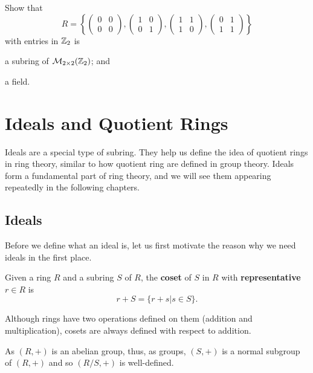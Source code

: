 \begin{problem}
    Show that
    \[
        R = \left\{\begin{pmatrix}0&0\\0&0\end{pmatrix},\begin{pmatrix}1&0\\0&1\end{pmatrix},\begin{pmatrix}1&1\\1&0\end{pmatrix},\begin{pmatrix}0&1\\1&1\end{pmatrix}\right\}
    \]
    with entries in $\mathbb{Z}_2$ is
    \begin{partquestions}{\roman*}
        \item a subring of $\mathcal{M}_{2\times2}(\mathbb{Z}_2)$; and
        \item a field.
    \end{partquestions}
\end{problem}

\chapter{Ideals and Quotient Rings}
Ideals are a special type of subring. They help us define the idea of quotient rings in ring theory, similar to how quotient ring are defined in group theory. Ideals form a fundamental part of ring theory, and we will see them appearing repeatedly in the following chapters.

\section{Ideals}
Before we define what an ideal is, let us first motivate the reason why we need ideals in the first place.
\begin{definition}
    Given a ring $R$ and a subring $S$ of $R$, the \textbf{coset} of $S$ in $R$ with \textbf{representative} $r \in R$ is
    \[
        r + S = \{r+s \vert s \in S\}.
    \]
\end{definition}
\begin{remark}
    Although rings have two operations defined on them (addition and multiplication), cosets are always defined with respect to addition.
\end{remark}
\begin{remark}
    As $(R,+)$ is an abelian group, thus, as groups, $(S,+)$ is a normal subgroup of $(R,+)$ and so $(R/S,+)$ is well-defined.
\end{remark}

